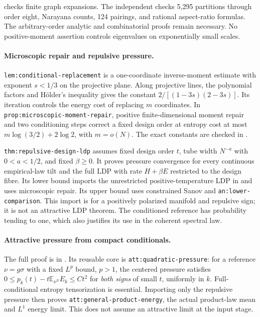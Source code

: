  checks
finite graph expansions. The independent
 checks
5,295 partitions through order eight, Narayana counts, 124 pairings,
and rational aspect-ratio formulas. The arbitrary-order analytic and
combinatorial proofs remain necessary. No positive-moment assertion
controls eigenvalues on exponentially small scales.

\paragraph{Microscopic repair and repulsive pressure.}
\texttt{lem:conditional-replacement} is a one-coordinate inverse-moment
estimate with exponent $s<1/3$ on the projective plane. Along projective
lines, the polynomial factors and H\"older's inequality gives the
constant $2/[(1-3s)(2-3s)]$. Its iteration controls the energy cost of
replacing $m$ coordinates. In
\texttt{prop:microscopic-moment-repair}, positive finite-dimensional
moment repair and two conditioning steps correct a fixed design order
at entropy cost at most $m\log(3/2)+2\log2$, with $m=o(N)$.
The exact constants are checked in
.

\texttt{thm:repulsive-design-ldp} assumes fixed design order $t$,
tube width $N^{-a}$ with $0<a<1/2$, and fixed $\beta\ge0$.
It proves pressure convergence for every continuous empirical-law tilt
and the full LDP with rate $H+\beta E$ restricted to the design fibre.
Its lower bound imports the unrestricted positive-temperature LDP in
\citet{prob_berman2017} and uses microscopic repair. Its upper bound
uses constrained Sanov and \texttt{an:lower-comparison}. This import is
for a positively polarized manifold and repulsive sign; it is not an
attractive LDP theorem. The conditioned reference has probability
tending to one, which also justifies its use in the coherent spectral
law.

\paragraph{Attractive pressure from compact conditionals.}
The full proof is in .
Its reusable core is \texttt{att:quadratic-pressure}: for a reference
$\nu=g\sigma$ with a fixed $L^p$ bound, $p>1$, the centered pressure
satisfies $0\le p_k(t)-t\mathbb E_{\nu^N}E_k\le Ct^2$ for
\emph{both signs} of small $t$, uniformly in $k$. Full-conditional
entropy tensorization is essential. Importing only the repulsive
pressure then proves \texttt{att:general-product-energy}, the actual
product-law mean and $L^1$ energy limit. This does not assume an
attractive limit at the input stage.

